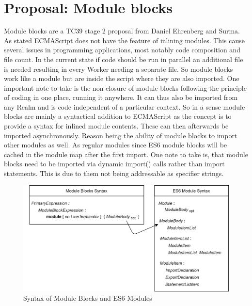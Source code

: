 \section{Proposal: Module blocks}
Module blocks are a TC39 stage 2 proposal from Daniel Ehrenberg and Surma. \cite{gitMB} As stated ECMAScript does not have the feature of inlining modules. This cause several issues in programming applications, most notably code composition and file count. In the current state if code should be run in parallel an additional file is needed resulting in every Worker needing a separate file. So module blocks work like a module but are inside the script where they are also imported. One important note to take is the non closure of module blocks following the principle of coding in one place, running it anywhere. It can thus also be imported from any Realm and is code independent of a particular context. So in a sense module blocks are mainly a syntactical addition to ECMAScript as the concept is to provide a syntax for inlined module contents. These can then afterwards be imported asynchronously. Reason being the ability of module blocks to import other modules as well. As regular modules since ES6 module blocks will be cached in the module map after the first import. One note to take is, that module blocks need to be imported via dynamic import() calls rather than import statements. This is due to them not being addressable as specifier strings.\\
\begin{figure}
	\includegraphics[scale=0.165]{../figures/ModuleSyntax.png}
	\caption{Syntax of Module Blocks and ES6 Modules \cite{gitMB, ecma}}
	\label{fig:mbSyn}
\end{figure}